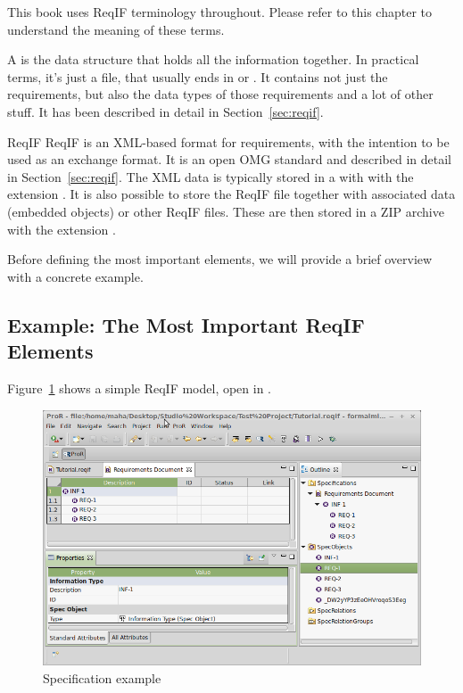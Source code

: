 \begin{info}
This book uses ReqIF terminology throughout.  Please refer to this chapter to understand the meaning of these terms.
\end{info}

A  is the data structure that holds all the information together.  In practical terms, it's just a file, that usually ends in  or .  It contains not just the requirements, but also the data types of those requirements and a lot of other stuff.  It has been described in detail in Section~\ref{sec:reqif}.

\begin{definition}{ReqIF}
ReqIF is an XML-based format for requirements, with the intention to be used as an exchange format.  It is an open OMG standard and described in detail in Section~\ref{sec:reqif}. The XML data is typically stored in a with with the extension .  It is also possible to store the ReqIF file together with associated data (embedded objects) or other ReqIF files.  These are then stored in a ZIP archive with the extension .
\end{definition}

Before defining the most important elements, we will provide a brief overview with a concrete example.

\subsection{Example: The Most Important ReqIF Elements}

Figure~\ref{fig:spec_example} shows a simple ReqIF model, open in \pror{}.  

\begin{figure}
  \centering
  \includegraphics[width=\textwidth]{../rmf-images/screenshot_INF_1.png}
  \caption{Specification example}
  \label{fig:spec_example}
\end{figure}

